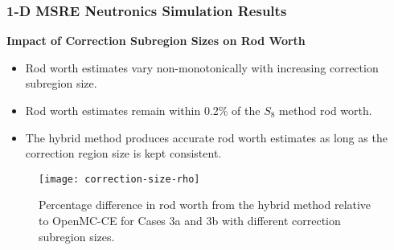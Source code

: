 \begin{frame}
  \frametitle{1-D MSRE Neutronics Simulation Results}
  \textbf{Impact of Correction Subregion Sizes on Rod Worth}
  \begin{itemize}
    \item Rod worth estimates vary non-monotonically with increasing correction subregion size.
    \item Rod worth estimates remain within 0.2\% of the $S_8$ method rod worth.
    \item The hybrid method produces accurate rod worth estimates as long as the correction region
      size is kept consistent.
  \end{itemize}
  \begin{figure}[htb!]
    \centering
    \texttt{[image: correction-size-rho]}
    \caption{Percentage difference in rod worth from the hybrid method relative to OpenMC-CE for
      Cases 3a and 3b with different correction subregion sizes.}
    \label{fig:v1-size-rho}
  \end{figure}
\end{frame}

